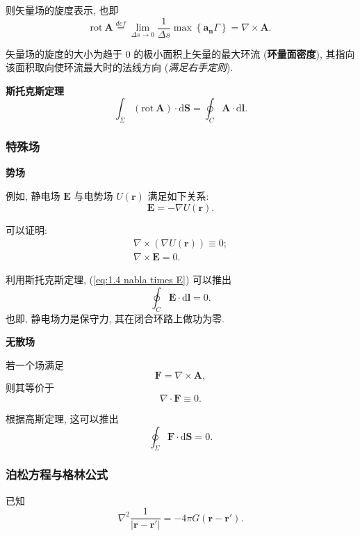 则矢量场的旋度表示, 也即
\begin{equation}
    \mathrm{rot}\ \bm{A}\stackrel{def}{=}\lim_{\Delta s\rightarrow 0}\frac{1}{\Delta s}\max\left\{\bm{a_n}\Gamma\right\}=\nabla\times\bm{A}.
\end{equation}

矢量场的旋度的大小为趋于 0 的极小面积上矢量的最大环流 (\textbf{环量面密度}), 其指向该面积取向使环流最大时的法线方向 (\textit{满足右手定则}).

\textbf{斯托克斯定理}
\begin{equation} \label{eq:1.4 stokes}
    \int_\Sigma(\mathrm{rot}\ \bm{A})\cdot\mathrm{d}\bm{S}=\oint_C\bm{A}\cdot\mathrm{d}\bm{l}.
\end{equation}

\subsubsection{特殊场}
\textbf{势场}

例如, 静电场 $\bm{E}$ 与电势场 $U(\bm{r})$ 满足如下关系:
\begin{equation}
    \bm{E}=-\nabla U(\bm{r}).
\end{equation}

可以证明:
\begin{gather}
    \nabla\times(\nabla U(\bm{r}))\equiv 0; \\
    \nabla\times\bm{E}=0. \label{eq:1.4 nabla times E}
\end{gather}

利用斯托克斯定理, (\ref{eq:1.4 nabla times E}) 可以推出
\begin{equation}
    \oint_C\bm{E}\cdot\mathrm{d}\bm{l}=0.
\end{equation}
也即, 静电场力是保守力, 其在闭合环路上做功为零.

\textbf{无散场}

若一个场满足
\begin{equation}
    \bm{F}=\nabla\times\bm{A},
\end{equation}
则其等价于
\begin{equation}
    \nabla\cdot\bm{F}\equiv 0.
\end{equation}

根据高斯定理, 这可以推出
\begin{equation}
    \oint_\Sigma\bm{F}\cdot\mathrm{d}\bm{S}=0.
\end{equation}

\subsubsection{泊松方程与格林公式}
已知
\begin{equation} \label{eq:1.4 nabla 2 r r'}
    \nabla^2\frac{1}{|\bm{r}-\bm{r}'|}=-4\pi G(\bm{r}-\bm{r}').
\end{equation}

